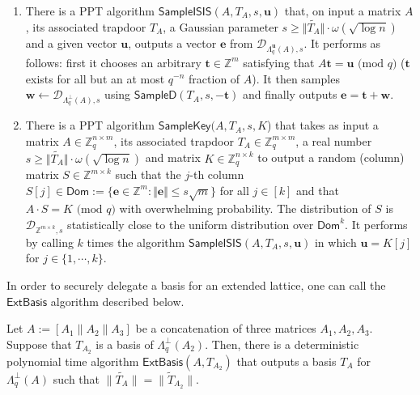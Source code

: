 \documentclass[runningheads]{llncs}
\def\ZZ{\mathbb{Z}}
\def\cal{\mathcal}
\def\bf{\mathbf}
\def\L{\Lambda}
\def\Lp{\Lambda^{\perp}}
\begin{document}
\begin{theorem}
\begin{enumerate}
	\item {\cite[Subsection 5.3.2]{GPV08}} There is a PPT algorithm $\mathsf{SampleISIS}(A,T_A,s,\mathbf{u})$ that, on input a matrix $A$, its associated trapdoor $T_A$, a Gaussian parameter $s \geq \Vert \widetilde{T_A} \Vert \cdot \omega(\sqrt{\log n})$ and a given vector $\mathbf{u}$,  outputs a vector $\mathbf{e}$ from $ \cal{D}_{\L_q^{\textbf{u}}(A),s}$. It performs as follows: first it chooses an arbitrary $\mathbf{t}\in \ZZ^m$ satisfying that $A\bf{t}=\bf{u} \text{ (mod } q)$ ($\bf{t}$ exists for all but an at most $q^{-n}$ fraction of $A$).  It then samples $\mathbf{w} \leftarrow \cal{D}_{\L_q^{\bot}(A),s}$ using $\mathsf{SampleD}( T_A,s,-\mathbf{t})$ and finally outputs $\mathbf{e}=\mathbf{t}+\mathbf{w}.$
	\item {\cite[Section 2]{LDS20}}
	There is a PPT  algorithm $\mathsf{SampleKey}(A, T_A, s, K$) that takes as input a matrix $A \in \mathbb{Z}_q^{n \times m}$, its associated trapdoor $T_A\in \mathbb{Z}_q^{m \times m}$, a real number $s \geq \Vert \widetilde{T_A} \Vert \cdot \omega(\sqrt{\log n})$ and  matrix $ K \in \mathbb{Z}_q^{n \times k}$ to output a random (column) matrix $S\in \mathbb{Z}^{m \times k}$ such that the $j$-th column $S[j] \in \mathsf{Dom}:= \{\mathbf{e} \in \mathbb{Z}^m: \Vert \mathbf{e} \Vert \leq s\sqrt{m} \}$ for all $j\in[k]$ and that $A \cdot S=K \text{ (mod } q)$ with overwhelming probability. The distribution of $S$  is $\mathcal{D}_{\mathbb{Z}^{m\times k},s}$ statistically close to the uniform distribution over $\mathsf{Dom}^k$. It performs by calling $k$ times the algorithm $\mathsf{SampleISIS}(A,T_A,s,\mathbf{u})$ in which $\mathbf{u}=K[j]$ for  $j \in \{1, \cdots, k\}$.

	
	\end{enumerate}
\end{theorem}

\noindent
In order to securely delegate a basis for an extended lattice, 
one can call the $\mathsf{ExtBasis}$ algorithm described below.
\begin{lemma} Let $A:=[A_1\|A_2\|A_3]$ be a concatenation of three matrices 
$A_1,A_2,A_3$. Suppose that $T_{A_2}$ is a basis of $\Lp_q(A_2)$. 
Then, there is a deterministic polynomial time algorithm  $\mathsf{ExtBasis}(A,T_{A_2})$ 
that outputs a basis $T_A$ for $\Lp_q(A)$ such that $\|\widetilde{T_A}\|=\|\widetilde{T}_{A_2}\|$.
\end{lemma}
\end{document}
